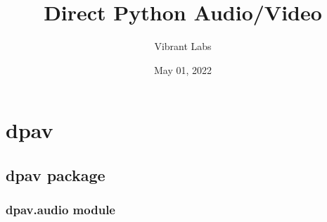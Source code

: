 \documentclass[letterpaper,10pt,english]{sphinxmanual}
\title{Direct Python Audio/Video}
\date{May 01, 2022}
\author{Vibrant Labs}
\begin{document}
\pagestyle{empty}
\sphinxmaketitle
\pagestyle{plain}
\sphinxtableofcontents
\pagestyle{normal}
\label{\detokenize{index::doc}}



\chapter{dpav}
\label{\detokenize{modules:dpav}}\label{\detokenize{modules::doc}}

\section{dpav package}
\label{\detokenize{dpav:dpav-package}}\label{\detokenize{dpav::doc}}

\subsection{dpav.audio module}
\label{\detokenize{dpav:module-dpav.audio}}\label{\detokenize{dpav:dpav-audio-module}}
\end{document}
